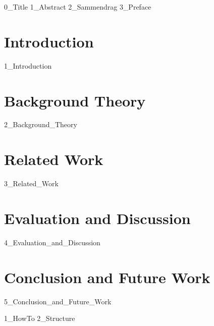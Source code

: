 \documentclass[11pt, twoside]{report} %
\begin{document}
{0_Title}
\frontmatter
{1_Abstract}
{2_Sammendrag}
{3_Preface}
\tableofcontents \clearpage
\listoffigures \clearpage
\listoftables \clearpage
\printglossary[type=\acronymtype] \clearpage %
\printglossary %
\afterpage{\blankpage} %
\mainmatter %



\clearpage\chapter{Introduction}
\label{cha:Introduction}
{1_Introduction}

\clearpage\chapter{Background Theory}
\label{cha:BackgroundTheory}
{2_Background_Theory}

\clearpage\chapter{Related Work} 
\label{cha:RelatedWork}
{3_Related_Work}

\clearpage\chapter{Evaluation and Discussion}
\label{cha:EvaluationAndDiscussion}
{4_Evaluation_and_Discussion}

\clearpage\chapter{Conclusion and Future Work}
\label{cha:ConclusionAndFutureWork}
{5_Conclusion_and_Future_Work}


\printbibliography[heading=bibintoc]


\addappendix
{1_HowTo} 
{2_Structure} 
\end{document}
